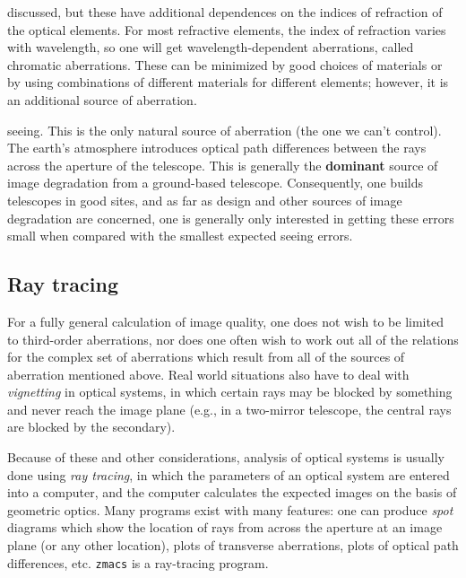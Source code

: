\documentclass[12pt]{article}
\begin{document}
\begin{itemize*}
        discussed, but these have additional dependences on the indices of
        refraction of the optical elements. For most refractive elements, the
        index of refraction varies with wavelength, so one will get
        wavelength-dependent aberrations, called chromatic aberrations. These
        can be minimized by good choices of materials or by using combinations
        of different materials for different elements; however, it is an
        additional source of aberration.
    \item seeing. This is the only natural source of aberration (the one
        we can't control).
        The earth's atmosphere introduces optical path differences
        between the rays across the aperture of the telescope. This is
        generally the \textbf{dominant} source of image degradation from a ground-based
        telescope. Consequently, one builds telescopes in good sites, and as
        far as design and other sources of image degradation are concerned,
        one is generally only interested in getting these errors small when
        compared with the smallest expected seeing errors.
\end{itemize*}

\subsection*{Ray tracing}

For a fully general calculation of image quality, one does not wish
to be limited to third-order aberrations, nor does one often wish to
work out all of the relations for the complex set of aberrations
which result from all of the sources of aberration mentioned above.
Real world situations also have to deal with \emph{vignetting} in optical
systems, in which certain rays may be blocked by something and never
reach the image plane (e.g., in a two-mirror telescope, the central
rays are blocked by the secondary).

Because of these and other considerations, analysis of optical
systems is usually done using \emph{ray tracing}, in which the parameters of
an optical system are entered into a computer, and the computer
calculates the expected images on the basis of geometric optics. Many
programs exist with many features: one can produce \emph{spot} diagrams
which show the location of rays from across the aperture at an image
plane (or any other location), plots of transverse aberrations, plots
of optical path differences, etc. \texttt{zmacs} is a ray-tracing
program.
\end{document}
